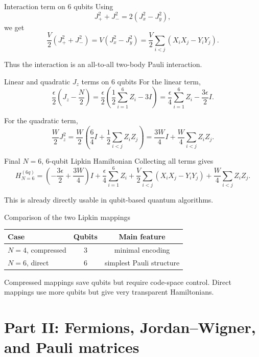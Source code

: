 \documentclass[aspectratio=169]{beamer}
\begin{document}
\begin{frame}{Interaction term on 6 qubits}
Using
\[
J_+^2+J_-^2=2(J_x^2-J_y^2),
\]
we get
\[
\frac{V}{2}(J_+^2+J_-^2)
=
V(J_x^2-J_y^2)
=
\frac{V}{2}\sum_{i<j}(X_iX_j-Y_iY_j).
\]

Thus the interaction is an all-to-all two-body Pauli interaction.
\end{frame}

\begin{frame}{Linear and quadratic \(J_z\) terms on 6 qubits}
For the linear term,
\[
\frac{\epsilon}{2}\left(J_z-\frac{N}{2}\right)
=
\frac{\epsilon}{2}\left(\frac12\sum_{i=1}^{6}Z_i - 3I\right)
=
\frac{\epsilon}{4}\sum_{i=1}^{6} Z_i - \frac{3\epsilon}{2}I.
\]

For the quadratic term,
\[
\frac{W}{2}J_z^2
=
\frac{W}{2}\left(\frac{6}{4}I+\frac12\sum_{i<j}Z_iZ_j\right)
=
\frac{3W}{4}I+\frac{W}{4}\sum_{i<j}Z_iZ_j.
\]
\end{frame}

\begin{frame}{Final \(N=6\), 6-qubit Lipkin Hamiltonian}
Collecting all terms gives
\[
H_{N=6}^{(6q)}
=
\left(-\frac{3\epsilon}{2}+\frac{3W}{4}\right)I
+
\frac{\epsilon}{4}\sum_{i=1}^{6} Z_i
+
\frac{V}{2}\sum_{i<j}(X_iX_j-Y_iY_j)
+
\frac{W}{4}\sum_{i<j} Z_iZ_j.
\]

This is already directly usable in qubit-based quantum algorithms.
\end{frame}

\begin{frame}{Comparison of the two Lipkin mappings}
\begin{center}
\begin{tabular}{lcc}
\hline
Case & Qubits & Main feature \\
\hline
\(N=4\), compressed & 3 & minimal encoding \\
\(N=6\), direct & 6 & simplest Pauli structure \\
\hline
\end{tabular}
\end{center}

Compressed mappings save qubits but require code-space control.
Direct mappings use more qubits but give very transparent Hamiltonians.
\end{frame}

\section{Part II: Fermions, Jordan--Wigner, and Pauli matrices}
\end{document}
